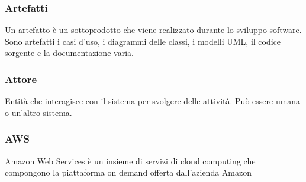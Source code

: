 \subsubsection*{Artefatti}
Un artefatto è un sottoprodotto che viene realizzato durante lo sviluppo software. Sono artefatti i casi d'uso, i diagrammi delle classi, i modelli UML\glo, il codice sorgente e la documentazione varia.

\subsubsection*{Attore}
Entità che interagisce con il sistema per svolgere delle attività. Può essere umana o un'altro sistema.

\subsubsection*{AWS}
Amazon Web Services è un insieme di servizi di cloud computing che compongono la piattaforma on demand offerta dall'azienda Amazon

